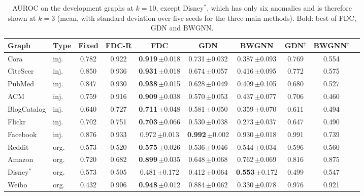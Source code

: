 \documentclass[pdflatex,sn-mathphys-ay]{sn-jnl}
\theoremstyle{plain}
\theoremstyle{remark}
\begin{document}
\begin{table}[!ht]
\caption{AUROC on the development graphs at $k=10$, except Disney$^{\ast}$, which has only six anomalies and is therefore shown at $k=3$ (mean, with standard deviation over five seeds for the three main methods). Bold: best of FDC, GDN and BWGNN.}
\label{tab:pergraph}
\scriptsize
\setlength{\tabcolsep}{2.4pt}
\begin{tabular*}{\textwidth}{@{\extracolsep{\fill}}llcccccccc@{}}
\toprule
Graph & Type & Fixed & FDC-R & FDC & GDN & BWGNN & GDN$^{\dagger}$ & BWGNN$^{\dagger}$ \\
\midrule
Cora & inj. & 0.782 & 0.922 & \textbf{0.919}\,{\tiny$\pm$0.018} & 0.731\,{\tiny$\pm$0.032} & 0.387\,{\tiny$\pm$0.093} & 0.769 & 0.554 \\
CiteSeer & inj. & 0.850 & 0.936 & \textbf{0.931}\,{\tiny$\pm$0.018} & 0.674\,{\tiny$\pm$0.057} & 0.416\,{\tiny$\pm$0.095} & 0.772 & 0.575 \\
PubMed & inj. & 0.847 & 0.930 & \textbf{0.938}\,{\tiny$\pm$0.015} & 0.628\,{\tiny$\pm$0.049} & 0.409\,{\tiny$\pm$0.105} & 0.680 & 0.527 \\
ACM & inj. & 0.759 & 0.916 & \textbf{0.909}\,{\tiny$\pm$0.038} & 0.570\,{\tiny$\pm$0.053} & 0.437\,{\tiny$\pm$0.077} & 0.706 & 0.460 \\
BlogCatalog & inj. & 0.640 & 0.727 & \textbf{0.711}\,{\tiny$\pm$0.048} & 0.581\,{\tiny$\pm$0.050} & 0.359\,{\tiny$\pm$0.070} & 0.611 & 0.494 \\
Flickr & inj. & 0.702 & 0.751 & \textbf{0.703}\,{\tiny$\pm$0.066} & 0.530\,{\tiny$\pm$0.038} & 0.273\,{\tiny$\pm$0.037} & 0.647 & 0.490 \\
Facebook & inj. & 0.876 & 0.933 & 0.972\,{\tiny$\pm$0.013} & \textbf{0.992}\,{\tiny$\pm$0.002} & 0.930\,{\tiny$\pm$0.018} & 0.991 & 0.739 \\
Reddit & org. & 0.573 & 0.520 & \textbf{0.575}\,{\tiny$\pm$0.026} & 0.536\,{\tiny$\pm$0.046} & 0.544\,{\tiny$\pm$0.034} & 0.596 & 0.560 \\
Amazon & org. & 0.720 & 0.682 & \textbf{0.899}\,{\tiny$\pm$0.035} & 0.648\,{\tiny$\pm$0.068} & 0.762\,{\tiny$\pm$0.069} & 0.816 & 0.875 \\
Disney$^{\ast}$ & org. & 0.573 & 0.505 & 0.481\,{\tiny$\pm$0.172} & 0.412\,{\tiny$\pm$0.064} & \textbf{0.553}\,{\tiny$\pm$0.172} & 0.499 & 0.547 \\
Weibo & org. & 0.432 & 0.906 & \textbf{0.948}\,{\tiny$\pm$0.012} & 0.884\,{\tiny$\pm$0.062} & 0.330\,{\tiny$\pm$0.078} & 0.976 & 0.921 \\

\end{tabular*}
\end{table}
\end{document}
